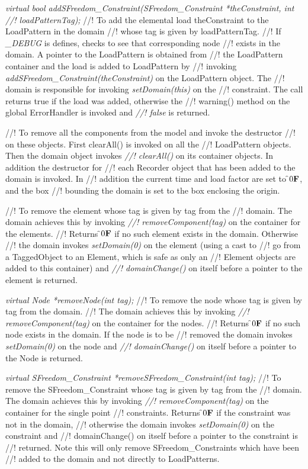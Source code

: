 {\em virtual bool addSFreedom\_Constraint(SFreedom\_Constraint *theConstraint, int
//! loadPatternTag);}    
//! To add the elemental load \p theConstraint to the LoadPattern in the domain
//! whose tag is given by \p loadPatternTag.
//! If {\em \_DEBUG} is defines, checks to see that corresponding node
//! exists in the domain. A pointer to the LoadPattern is obtained from
//! the LoadPattern container and the load is added to LoadPattern by
//! invoking {\em addSFreedom\_Constraint(theConstraint)} on the LoadPattern object. The
//! domain is responsible for invoking {\em setDomain(this)} on the
//! constraint. The call returns \p true if the load was added, otherwise the
//! warning() method on the global ErrorHandler is invoked and {\em
//! false} is returned. 


//! To remove all the components from the model and invoke the destructor
//! on these objects. First clearAll() is invoked on all the
//! LoadPattern objects. Then the domain object invokes {\em
//! clearAll()} on its container objects. In addition the destructor for
//! each Recorder object that has been added to the domain is invoked. In
//! addition the current time and load factor are set to \f$0{\bf F}$, and the box
//! bounding the domain is set to the box enclosing the origin. 


//! To remove the element whose tag is given by \p tag from the
//! domain. The domain achieves this by invoking {\em
//! removeComponent(tag)} on the container for the elements. 
//! Returns \f$0{\bf F}$ if no such element exists in the domain. Otherwise 
//! the domain invokes {\em setDomain(0)} on the element (using a cast to
//! go from a TaggedObject to an Element, which is safe as only an
//! Element objects are added to this container) and {\em
//! domainChange()} on itself before a pointer to the element is returned. 

{\em virtual Node *removeNode(int tag);}    
//! To remove the node whose tag is given by \p tag from the domain. 
//! The domain achieves this by invoking {\em
//! removeComponent(tag)} on the container for the nodes. 
//! Returns \f$0{\bf F}$ if no such node exists in the domain. If the node is to be
//! removed the domain invokes {\em setDomain(0)} on the node and {\em
//! domainChange()} on itself before a pointer to the Node is returned. 

{\em virtual SFreedom\_Constraint *removeSFreedom\_Constraint(int tag);}
//! To remove the SFreedom\_Constraint whose tag is given by \p tag from the
//! domain. The domain achieves this by invoking {\em
//! removeComponent(tag)} on the container for the single point
//! constraints. Returns \f$0{\bf F}$ if the constraint was not in the domain,
//! otherwise the domain invokes {\em setDomain(0)} on the constraint and
//! domainChange() on itself before a pointer to the constraint is
//! returned. Note this will only remove SFreedom\_Constraints which have been
//! added to the domain and not directly to LoadPatterns.

